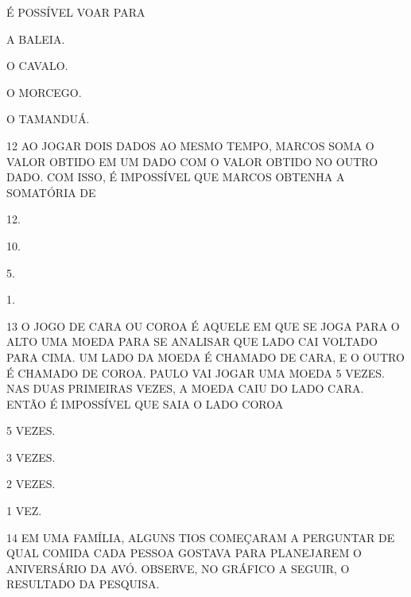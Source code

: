 É POSSÍVEL VOAR PARA

\begin{escolha}[itemsep=0pt]
\item A BALEIA.

\item O CAVALO.

\item O MORCEGO.

\item O TAMANDUÁ.
\end{escolha}

\num{12} AO JOGAR DOIS DADOS AO MESMO TEMPO, MARCOS SOMA O VALOR OBTIDO EM UM DADO COM O VALOR OBTIDO NO OUTRO DADO.
COM ISSO, É IMPOSSÍVEL QUE MARCOS OBTENHA A SOMATÓRIA DE

\begin{escolha}[itemsep=0pt]
\item 12.

\item 10.

\item 5.

\item 1.
\end{escolha}

\pagebreak
\num{13} O JOGO DE CARA OU COROA É AQUELE EM QUE SE JOGA PARA O ALTO UMA MOEDA
PARA SE ANALISAR QUE LADO CAI VOLTADO PARA CIMA. UM LADO DA MOEDA É CHAMADO DE
CARA, E O OUTRO É CHAMADO DE COROA. PAULO VAI JOGAR UMA MOEDA 5 VEZES. NAS DUAS
PRIMEIRAS VEZES, A MOEDA CAIU DO LADO CARA. ENTÃO É IMPOSSÍVEL QUE SAIA O LADO
COROA

\begin{escolha}[itemsep=0pt]
\item 5 VEZES.

\item 3 VEZES.

\item 2 VEZES.

\item 1 VEZ.
\end{escolha}

\num{14} EM UMA FAMÍLIA, ALGUNS TIOS COMEÇARAM A PERGUNTAR DE QUAL COMIDA CADA
PESSOA GOSTAVA PARA PLANEJAREM O ANIVERSÁRIO DA AVÓ. OBSERVE, NO GRÁFICO A SEGUIR,
O RESULTADO DA PESQUISA.

